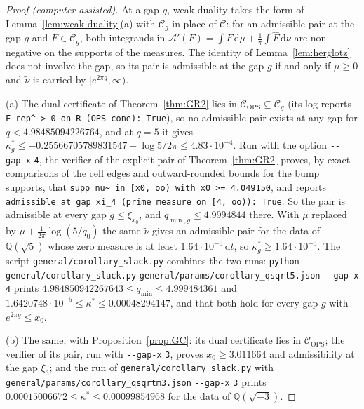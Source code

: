 \documentclass[11pt]{amsart}
\newcommand{\QQ}{\mathbb Q}
\newcommand{\dd}{\,\mathrm d}
\newcommand{\hF}{\widehat F}
\newcommand{\xin}[1]{\xi_{#1}}
\newcommand{\Arch}{\mathcal A}
\newcommand{\Cone}{\mathcal C}
\newcommand{\ConeOPS}{\mathcal C_{\mathrm{OPS}}}
\newcommand{\kstar}{\kappa^{*}}
\newcommand{\qmin}{q_{\min}}
\theoremstyle{definition}
\theoremstyle{remark}
\numberwithin{equation}{section}
\begin{document}
\begin{proof}[Proof \textup{(computer-assisted)}]
At a gap $g$, weak duality takes the form of Lemma~\ref{lem:weak-duality}(a) with $\Cone_g$ in place of $\Cone$: for an admissible
pair at the gap $g$ and $F\in\Cone_g$, both integrands in $\Arch'(F)=\int F\dd\mu+\frac1\pi\int\hF\dd\nu$ are non-negative on the supports
of the measures. The identity of Lemma~\ref{lem:herglotz} does not involve the gap, so its pair is admissible at the gap $g$ if and only
if $\mu\ge0$ and $\tilde\nu$ is carried by $[e^{2\pi g},\infty)$.

(a) The dual certificate of Theorem~\ref{thm:GR2} lies in $\ConeOPS\subseteq\Cone_g$ (its log reports
\texttt{F\_rep\^{} > 0 on R (OPS cone): True}), so no admissible pair exists at any gap for $q<4.98485094226764$, and at $q=5$ it
gives $\kstar_g\le-0.25566705789831547+\log5/2\pi\le4.83\cdot10^{-4}$. Run with the option \nolinkurl{--gap-x} \nolinkurl{4}, the verifier
of the explicit pair of Theorem~\ref{thm:GR2} proves, by exact comparisons of the cell edges and outward-rounded bounds for the bump
supports, that \texttt{supp nu\textasciitilde{} in [x0, oo) with x0 >= 4.049150}, and reports \texttt{admissible at gap xi\_4 (prime
measure on [4, oo)): True}. So the pair is admissible at every gap $g\le\xin{x_0}$, and $q_{\min,g}\le4.9994844$ there. With $\mu$
replaced by $\mu+\frac1{2\pi}\log(5/q_0)$ the same $\tilde\nu$ gives an admissible pair for the data of $\QQ(\sqrt5)$ whose zero measure
is at least $1.64\cdot10^{-5}\dd t$, so $\kstar_g\ge1.64\cdot10^{-5}$. The script \nolinkurl{general/corollary_slack.py} combines the two
runs: \texttt{python} \nolinkurl{general/corollary_slack.py} \nolinkurl{general/params/corollary_qsqrt5.json} \nolinkurl{--gap-x}
\nolinkurl{4} prints $4.984850942267643\le\qmin\le4.999484361$ and $1.6420748\cdot10^{-5}\le\kstar\le0.00048294147$, and that both hold
for every gap $g$ with $e^{2\pi g}\le x_0$.

(b) The same, with Proposition~\ref{prop:GC}: its dual certificate lies in $\ConeOPS$; the verifier of its pair, run with
\nolinkurl{--gap-x} \nolinkurl{3}, proves $x_0\ge3.011664$ and admissibility at the gap $\xin3$; and the run of
\nolinkurl{general/corollary_slack.py} with \nolinkurl{general/params/corollary_qsqrtm3.json} \nolinkurl{--gap-x} \nolinkurl{3} prints
$0.00015006672\le\kstar\le0.00099854968$ for the data of $\QQ(\sqrt{-3})$.
\end{proof}
\end{document}

